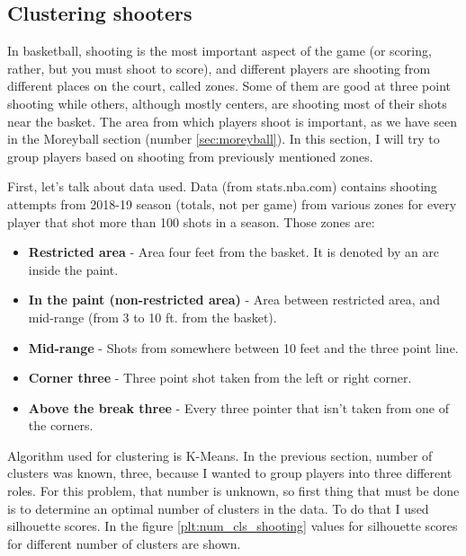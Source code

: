 \documentclass[a4paper]{article}
\begin{document}
\subsection{Clustering shooters}
\label{subsec:clust_shooters}

In basketball, shooting is the most important aspect of the game (or scoring, rather, but you must shoot to score), and different players are shooting from different places on the court, called zones. Some of them are good at three point shooting while others, although mostly centers, are shooting most of their shots near the basket. The area from which players shoot is important, as we have seen in the Moreyball section (number \ref{sec:moreyball}). In this section, I will try to group players based on shooting from previously mentioned zones.

First, let's talk about data used. Data (from stats.nba.com) contains shooting attempts from 2018-19 season (totals, not per game) from various zones for every player that shot more than 100 shots in a season. Those zones are:

\begin{itemize}
	\item \textbf{Restricted area} - Area four feet from the basket. It is denoted by an arc inside the paint.
	\item \textbf{In the paint (non-restricted area)} - Area between restricted area, and mid-range (from 3 to 10 ft. from the basket).
	\item \textbf{Mid-range} - Shots from somewhere between 10 feet and the three point line.
	\item \textbf{Corner three} - Three point shot taken from the left or right corner.
	\item \textbf{Above the break three} - Every three pointer that isn't taken from one of the corners. 
\end{itemize}

Algorithm used for clustering is K-Means. In the previous section, number of clusters was known, three, because I wanted to group players into three different roles. For this problem, that number is unknown, so first thing that must be done is to determine an optimal number of clusters in the data. To do that I used silhouette scores. In the figure \ref{plt:num_cls_shooting} values for silhouette scores for different number of clusters are shown. 
\end{document}
